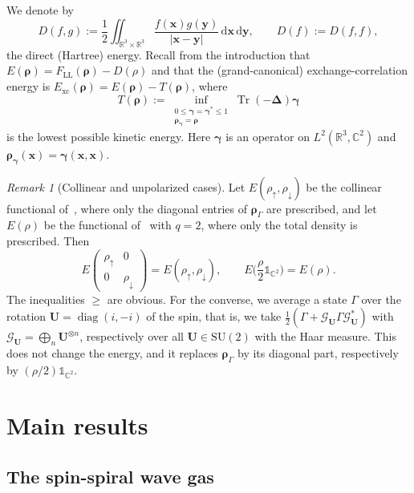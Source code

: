 \documentclass[final,reqno]{amsart}
\theoremstyle{remark}
\newtheorem{remark}{Remark}
\renewcommand{\le}{\leqslant}
\renewcommand{\ge}{\geqslant}
\newcommand{\spu}{\uparrow}
\newcommand{\spd}{\downarrow}
\DeclareMathOperator{\diag}{diag}
\DeclareMathOperator{\Tr}{Tr}
\newcommand{\RR}{\mathbb{R}}
\newcommand{\CC}{\mathbb{C}}
\newcommand{\SU}{\mathrm{SU}}
\newcommand{\LL}{\mathrm{LL}}
\newcommand{\xc}{\mathrm{xc}}
\newcommand{\iden}{\mathbb{1}}
\newcommand{\lapl}{\bm{\Delta}}
\newcommand{\dd}{\mathrm{d}}
\newcommand{\GC}{\mathcal{G}}
\begin{document}
We denote by
$$
D(f,g):=\frac12\iint_{\RR^3\times\RR^3}\frac{f(\mathbf{x})g(\mathbf{y})}{|\mathbf{x}-\mathbf{y}|}\,\dd\mathbf{x}\,\dd\mathbf{y},\qquad D(f):=D(f,f),
$$
the direct (Hartree) energy. Recall from the introduction that $E(\bm{\rho})=F_\LL(\bm{\rho})-D(\rho)$ and that the (grand-canonical) exchange-correlation energy is $E_\xc(\bm{\rho})=E(\bm{\rho})-T(\bm{\rho})$, where
\begin{equation}\label{eq:def_T}
T(\bm{\rho}):=\inf_{\substack{0\le \bm{\gamma}=\bm{\gamma}^*\le 1\\ \bm{\rho}_{\bm{\gamma}}=\bm{\rho}}}\Tr(-\lapl)\bm{\gamma}
\end{equation}
is the lowest possible kinetic energy. Here $\bm{\gamma}$ is an operator on $L^2(\RR^3,\CC^2)$ and $\bm{\rho}_{\bm{\gamma}}(\mathbf{x})=\bm{\gamma}(\mathbf{x},\mathbf{x})$.

\begin{remark}[Collinear and unpolarized cases]\label{rmk:collinear}
Let $E(\rho_\spu,\rho_\spd)$ be the collinear functional of~\cite[Remark~6]{lewin2020local}, where only the diagonal entries of $\bm{\rho}_\Gamma$ are prescribed, and let $E(\rho)$ be the functional of~\cite{lewin2020local} with $q=2$, where only the total density is prescribed. Then
\begin{equation*}
E\begin{pmatrix}\rho_\spu&0\\0&\rho_\spd\end{pmatrix}=E(\rho_\spu,\rho_\spd),\qquad E\Big(\frac{\rho}{2}\iden_{\CC^2}\Big)=E(\rho).
\end{equation*}
The inequalities $\ge$ are obvious. For the converse, we average a state $\Gamma$ over the rotation $\mathbf{U}=\diag(i,-i)$ of the spin, that is, we take $\frac12(\Gamma+\GC_{\mathbf{U}}\Gamma \GC_{\mathbf{U}}^*)$ with $\GC_{\mathbf{U}}=\bigoplus_n\mathbf{U}^{\otimes n}$, respectively over all $\mathbf{U}\in\SU(2)$ with the Haar measure. This does not change the energy, and it replaces $\bm{\rho}_\Gamma$ by its diagonal part, respectively by $(\rho/2)\iden_{\CC^2}$.
\end{remark}

\section{Main results}\label{sec:main}

\subsection{The spin-spiral wave gas}\label{sec:spirals}
\end{document}

